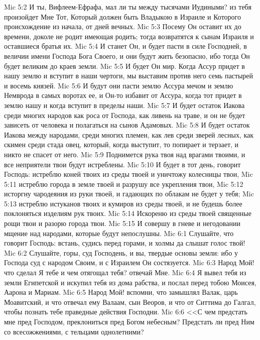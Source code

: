 \rsbpar\vs Mic 5:2 И ты, Вифлеем-Ефрафа, мал ли ты между тысячами Иудиными? из тебя произойдет Мне Тот, Который должен быть Владыкою в Израиле и Которого происхождение из начала, от дней вечных.
\vs Mic 5:3 Посему Он оставит их до времени, доколе не родит имеющая родить; тогда возвратятся к сынам Израиля и оставшиеся братья их.
\vs Mic 5:4 И станет Он, и будет пасти в силе Господней, в величии имени Господа Бога Своего, и они будут жить безопасно, ибо тогда Он будет великим до краев земли.
\vs Mic 5:5 И будет Он мир. Когда Ассур придет в нашу землю и вступит в наши чертоги, мы выставим против него семь пастырей и восемь князей.
\vs Mic 5:6 И будут они пасти землю Ассура мечом и землю Немврода в самых воротах ее, и Он-то избавит от Ассура, когда тот придет в землю нашу и когда вступит в пределы наши.
\vs Mic 5:7 И будет остаток Иакова среди многих народов как роса от Господа, как ливень на траве, и он не будет зависеть от человека и полагаться на сынов Адамовых.
\vs Mic 5:8 И будет остаток Иакова между народами, среди многих племен, как лев среди зверей лесных, как скимен среди стада овец, который, когда выступит, то попирает и терзает, и никто не спасет от него.
\vs Mic 5:9 Поднимется рука твоя над врагами твоими, и все неприятели твои будут истреблены.
\vs Mic 5:10 И будет в тот день, говорит Господь: истреблю коней твоих из среды твоей и уничтожу колесницы твои,
\vs Mic 5:11 истреблю города в земле твоей и разрушу все укрепления твои,
\vs Mic 5:12 исторгну чародеяния из руки твоей, и гадающих по облакам не будет у тебя;
\vs Mic 5:13 истреблю истуканов твоих и кумиров из среды твоей, и не будешь более поклоняться изделиям рук твоих.
\vs Mic 5:14 Искореню из среды твоей священные рощи твои и разорю города твои.
\vs Mic 5:15 И совершу в гневе и негодовании мщение над народами, которые будут непослушны.
\vs Mic 6:1 Слушайте, что говорит Господь: встань, судись перед горами, и холмы да слышат голос твой!
\vs Mic 6:2 Слушайте, горы, суд Господень, и вы, твердые основы земли: ибо у Господа суд с народом Своим, и с Израилем Он состязуется.
\vs Mic 6:3 Народ Мой! что сделал Я тебе и чем отягощал тебя? отвечай Мне.
\vs Mic 6:4 Я вывел тебя из земли Египетской и искупил тебя из дома рабства, и послал перед тобою Моисея, Аарона и Мариам.
\vs Mic 6:5 Народ Мой! вспомни, что замышлял Валак, царь Моавитский, и что отвечал ему Валаам, сын Веоров, и что  от Ситтима до Галгал, чтобы познать тебе праведные действия Господни.
\rsbpar\vs Mic 6:6 <<С чем предстать мне пред Господом, преклониться пред Богом небесным? Предстать ли пред Ним со всесожжениями, с тельцами однолетними?
